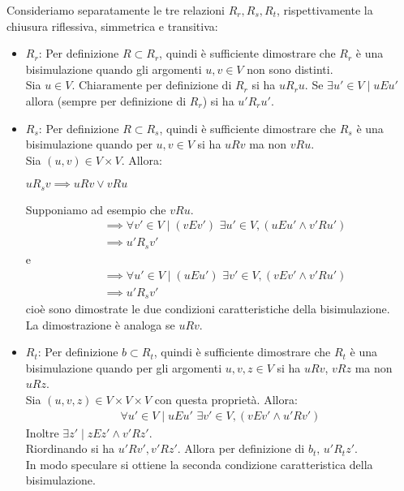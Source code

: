 \begin{proof2}
    Consideriamo separatamente le tre relazioni $R_r, R_s, R_t$, rispettivamente la chiusura riflessiva, simmetrica e transitiva:
    \begin{itemize}
        \item $R_r$: Per definizione $R \subset R_r$, quindi è sufficiente dimostrare che $R_r$ è una bisimulazione quando gli argomenti $u,v \in V$ non sono distinti.\\
        Sia $u \in V$. Chiaramente per definizione di $R_r$ si ha $u R_r u$. Se $\exists u' \in V \mid u E u'$ allora (sempre per definizione di $R_r$) si ha $u' R_r u'$.
        \item $R_s$: Per definizione $R \subset R_s$, quindi è sufficiente dimostrare che $R_s$ è una bisimulazione quando per $u,v \in V$ si ha $u R v$ ma non $v R u$.\\
        Sia $(u,v) \in V\times V$. Allora:
        \begin{center}
            $u R_s v \implies u R v \lor v R u$
        \end{center}
        Supponiamo ad esempio che $v R u$.
        \begin{align*}
            &\implies \forall v' \in V\mid (v E v') \,\,\exists u' \in V, (u E u' \land v' R u')\\
            &\implies u' R_s v'
        \end{align*}
        e
        \begin{align*}
            &\implies \forall u' \in V\mid (u E u') \,\,\exists v' \in V, (v E v' \land v' R u')\\
            &\implies u' R_s v'
        \end{align*}
        cioè sono dimostrate le due condizioni caratteristiche della bisimulazione.\\
        La dimostrazione è analoga se $u R v$.
        \item $R_t$: Per definizione $b \subset R_t$, quindi è sufficiente dimostrare che $R_t$ è una bisimulazione quando per gli argomenti $u,v,z \in V$ si ha $u R v$, $v R z$ ma non $u R z$.\\
        Sia $(u,v,z) \in V\times V\times V$ con questa proprietà. Allora:
        \begin{gather*}
            \forall u' \in V\mid u E u' \,\, \exists v' \in V, (v E v' \land u' R v')
        \end{gather*}
        Inoltre $\exists z' \mid z E z' \land v' R z'$.\\
        Riordinando si ha $u' R v', v' R z'$. Allora per definizione di $b_t, \, u' R_t z'$.\\
        In modo speculare si ottiene la seconda condizione caratteristica della bisimulazione.
    \end{itemize}
    \vspace*{-0.75cm}
\end{proof2}
